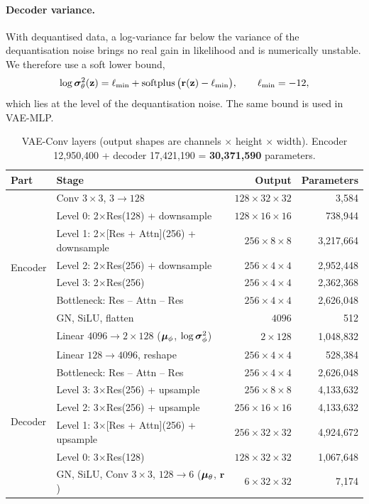 \paragraph{Decoder variance.} With dequantised data, a log-variance far below the variance of the dequantisation
noise brings no real gain in likelihood and is numerically unstable. We therefore use a soft lower bound,
\begin{equation}
  \log\bm{\sigma}^2_\theta(\mathbf{z}) = \ell_{\min} + \operatorname{softplus}\big(\mathbf{r}(\mathbf{z})-\ell_{\min}\big),
  \qquad \ell_{\min}=-12,
\end{equation}
which lies at the level of the dequantisation noise. The same bound is used in VAE-MLP.

\begin{table}[t]
\centering\small
\caption{VAE-Conv layers (output shapes are channels $\times$ height $\times$ width). Encoder 12,950,400 +
decoder 17,421,190 = \textbf{30,371,590} parameters.}
\label{tab:arch-conv}
\begin{tabular}{@{}llrr@{}}
\toprule
Part & Stage & Output & Parameters\\
\midrule
\multirow{8}{*}{Encoder}
 & Conv $3\times3$, $3\to128$ & $128\times32\times32$ & 3,584\\
 & Level 0: 2$\times$Res(128) + downsample & $128\times16\times16$ & 738,944\\
 & Level 1: 2$\times$[Res + Attn](256) + downsample & $256\times8\times8$ & 3,217,664\\
 & Level 2: 2$\times$Res(256) + downsample & $256\times4\times4$ & 2,952,448\\
 & Level 3: 2$\times$Res(256) & $256\times4\times4$ & 2,362,368\\
 & Bottleneck: Res -- Attn -- Res & $256\times4\times4$ & 2,626,048\\
 & GN, SiLU, flatten & $4096$ & 512\\
 & Linear $4096\to2\times128$ ($\bm{\mu}_\phi$, $\log\bm{\sigma}^2_\phi$) & $2\times128$ & 1,048,832\\
\midrule
\multirow{7}{*}{Decoder}
 & Linear $128\to4096$, reshape & $256\times4\times4$ & 528,384\\
 & Bottleneck: Res -- Attn -- Res & $256\times4\times4$ & 2,626,048\\
 & Level 3: 3$\times$Res(256) + upsample & $256\times8\times8$ & 4,133,632\\
 & Level 2: 3$\times$Res(256) + upsample & $256\times16\times16$ & 4,133,632\\
 & Level 1: 3$\times$[Res + Attn](256) + upsample & $256\times32\times32$ & 4,924,672\\
 & Level 0: 3$\times$Res(128) & $128\times32\times32$ & 1,067,648\\
 & GN, SiLU, Conv $3\times3$, $128\to6$ ($\bm{\mu}_\theta$, $\mathbf{r}$) & $6\times32\times32$ & 7,174\\
\bottomrule
\end{tabular}
\end{table}


